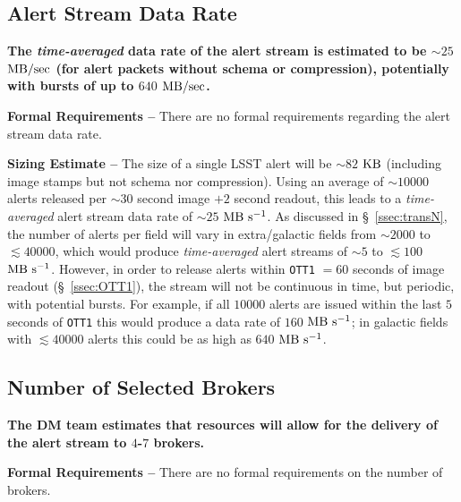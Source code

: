 \documentclass[DM,authoryear,toc]{lsstdoc}
\begin{document}
\subsection{Alert Stream Data Rate}\label{ssec:data_rate}

{\bf The {\it time-averaged} data rate of the alert stream is estimated to be $\sim25$ $\rm MB/sec$ (for alert packets without schema or compression), potentially with bursts of up to $640$ $\rm MB/sec$.}


{\bf Formal Requirements --} There are no formal requirements regarding the alert stream data rate. 

{\bf Sizing Estimate --} The size of a single LSST alert will be $\sim82$ $\rm KB$ (including image stamps but not schema nor compression). Using an average of $\sim10000$ alerts released per $\sim30$ second image $+2$ second readout, this leads to a {\it time-averaged} alert stream data rate of  $\sim25$ $\rm MB\ s^{-1}$. As discussed in \S~\ref{ssec:transN}, the number of alerts per field will vary in extra/galactic fields from $\sim2000$ to $\lesssim40000$, which would produce {\it time-averaged} alert streams of $\sim5$ to $\lesssim100$ $\rm MB\ s^{-1}$. However, in order to release alerts within {\tt OTT1} $=60$ seconds of image readout (\S~\ref{ssec:OTT1}), the stream will not be continuous in time, but periodic, with potential bursts. For example, if all $10000$ alerts are issued within the last $5$ seconds of {\tt OTT1} this would produce a data rate of $160$ $\rm MB\ s^{-1}$; in galactic fields with $\lesssim40000$ alerts this could be as high as $640$ $\rm MB\ s^{-1}$.


\subsection{Number of Selected Brokers}\label{ssec:num_brokers}

{\bf The DM team estimates that resources will allow for the delivery of the alert stream to $4$-$7$ brokers.}

{\bf Formal Requirements --} There are no formal requirements on the number of brokers. %
\end{document}
